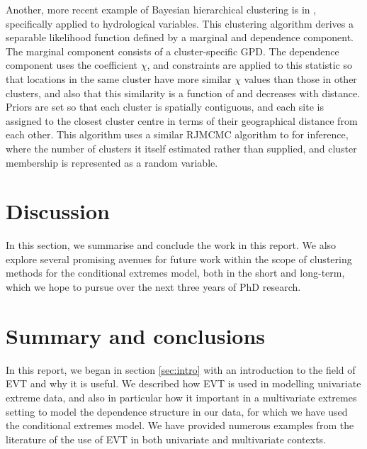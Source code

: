 \documentclass{article}
\numberwithin{equation}{section}
\begin{document}

Another, more recent example of Bayesian hierarchical clustering is in \citet{Rohrbeck2021}, specifically applied to hydrological variables. 
This clustering algorithm derives a separable likelihood function defined by a marginal and dependence component.
The marginal component consists of a cluster-specific GPD.
The dependence component uses the coefficient $\chi$, and constraints are applied to this statistic so that locations in the same cluster have more similar $\chi$ values than those in other clusters, and also that this similarity is a function of and decreases with distance.
Priors are set so that each cluster is spatially contiguous, and each site is assigned to the closest cluster centre in terms of their geographical distance from each other.
This algorithm uses a similar RJMCMC algorithm to \citet{Bottolo2003} for inference, where the number of clusters it itself estimated rather than supplied, and cluster membership is represented as a random variable. 


\newpage
\section{Discussion} \label{sec:discussion}

In this section, we summarise and conclude the work in this report. 
We also explore several promising avenues for future work within the scope of clustering methods for the conditional extremes model, both in the short and long-term, which we hope to pursue over the next three years of PhD research. 

\section{Summary and conclusions}

In this report, we began in section \ref{sec:intro} with an introduction to the field of EVT and why it is useful.
We described how EVT is used in modelling univariate extreme data, and also in particular how it important in a multivariate extremes setting to model the dependence structure in our data, for which we have used the conditional extremes model.
We have provided numerous examples from the literature of the use of EVT in both univariate and multivariate contexts. 
\end{document}
